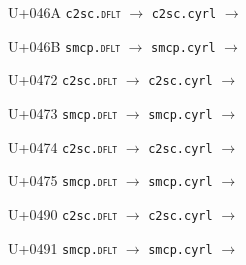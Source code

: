 \documentclass{article}
\begin{document}
\begin{substitutions}
\goodbreak

U+046A  \linebreak
    \texttt{c2sc.\textsc{dflt}} $\to$  \linebreak
    \texttt{c2sc.cyrl} $\to$  

\goodbreak

U+046B  \linebreak
    \texttt{smcp.\textsc{dflt}} $\to$  \linebreak
    \texttt{smcp.cyrl} $\to$  

\goodbreak

U+0472  \linebreak
    \texttt{c2sc.\textsc{dflt}} $\to$  \linebreak
    \texttt{c2sc.cyrl} $\to$  

\goodbreak

U+0473  \linebreak
    \texttt{smcp.\textsc{dflt}} $\to$  \linebreak
    \texttt{smcp.cyrl} $\to$  

\goodbreak

U+0474  \linebreak
    \texttt{c2sc.\textsc{dflt}} $\to$  \linebreak
    \texttt{c2sc.cyrl} $\to$  

\goodbreak

U+0475  \linebreak
    \texttt{smcp.\textsc{dflt}} $\to$  \linebreak
    \texttt{smcp.cyrl} $\to$  

\goodbreak

U+0490  \linebreak
    \texttt{c2sc.\textsc{dflt}} $\to$  \linebreak
    \texttt{c2sc.cyrl} $\to$  

\goodbreak

U+0491  \linebreak
    \texttt{smcp.\textsc{dflt}} $\to$  \linebreak
    \texttt{smcp.cyrl} $\to$  

\goodbreak

\end{substitutions}
\end{document}
